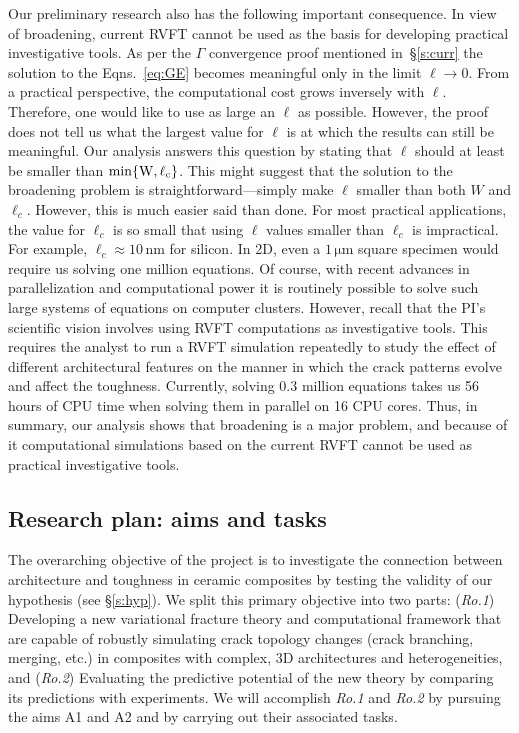 \documentclass[10pt,letterpaper]{article}
\newcommand{\unit}[1]{\ensuremath{\, \mathrm{#1}}}
\begin{document}
    Our preliminary research also has the following important consequence.
    In view of broadening, current RVFT cannot be used as the basis for developing practical investigative tools.
    As per the $\mathit{\Gamma}$ convergence proof mentioned in~\S\ref{s:curr} the solution to the Eqns.~\eqref{eq:GE} becomes meaningful only in the limit $\ell\to 0$.
    From a practical perspective, the computational cost grows inversely with $\ell$.
    Therefore, one would like to use as large an $\ell$ as possible.
    However, the proof does not tell us what the largest value for $\ell$ is at which the results can still be meaningful.
    Our analysis answers this question by stating that $\ell$ should at least be smaller than $\rm{min}\{W, \ell_c\}$.
    This might suggest that the solution to the broadening problem is straightforward---simply make $\ell$ smaller than both $W$ and $\ell_c$.
    However, this is much easier said than done.
    For most practical applications, the value for $\ell_c$ is so small that using $\ell$ values smaller than $\ell_c$ is impractical.
    For example, $\ell_c\approx 10\unit{nm}$ for silicon.
    In 2D, even a $1\unit{\mu m}$ square specimen would require us solving one million equations.  Of course, with recent advances in parallelization and computational power it is routinely possible to solve such large systems of equations on computer clusters.
    However, recall that the PI's scientific vision involves using RVFT computations as investigative tools.
    This requires the analyst to run a RVFT simulation repeatedly to study the effect of different architectural features on the manner in which the crack patterns evolve and affect the toughness.
    Currently, solving 0.3 million equations takes us 56 hours of CPU time when solving them in parallel on 16 CPU cores.
    Thus, in summary, our analysis shows that broadening is a major problem, and because of it computational simulations based on the current RVFT cannot be used as practical investigative tools.

  \subsection{Research plan: aims and tasks}
    \label{s:aims}
    The overarching objective of the project is to investigate the connection between architecture and toughness in ceramic composites by testing the validity of our hypothesis (see \S \ref{s:hyp}). We split this primary objective into two parts: (\emph{Ro.1}) Developing a new variational fracture theory and computational framework that are capable of robustly simulating crack topology changes (crack branching, merging, etc.) in composites with complex, 3D architectures and heterogeneities, and (\emph{Ro.2}) Evaluating the predictive potential of the new theory by comparing its predictions with experiments. We will accomplish \emph{Ro.1} and \emph{Ro.2} by pursuing the aims A1 and A2 and by carrying out their associated tasks.
\end{document}
